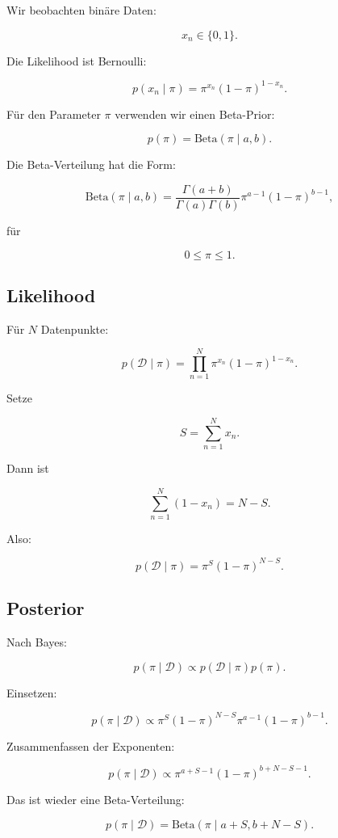 Wir beobachten binäre Daten:

\[
    x_n \in \{0,1\}.
\]

Die Likelihood ist Bernoulli:

\[
    p(x_n \mid \pi)
    =
    \pi^{x_n}
    (1-\pi)^{1-x_n}.
\]

Für den Parameter \(\pi\) verwenden wir einen Beta-Prior:

\[
    p(\pi)
    =
    \mathrm{Beta}(\pi \mid a,b).
\]

Die Beta-Verteilung hat die Form:

\[
    \mathrm{Beta}(\pi \mid a,b)
    =
    \frac{\Gamma(a+b)}{\Gamma(a)\Gamma(b)}
    \pi^{a-1}
    (1-\pi)^{b-1},
\]

für

\[
    0 \leq \pi \leq 1.
\]

\subsection{Likelihood}

Für \(N\) Datenpunkte:

\[
    p(\mathcal{D} \mid \pi)
    =
    \prod_{n=1}^{N}
    \pi^{x_n}
    (1-\pi)^{1-x_n}.
\]

Setze

\[
    S
    =
    \sum_{n=1}^{N}
    x_n.
\]

Dann ist

\[
    \sum_{n=1}^{N}
    (1-x_n)
    =
    N-S.
\]

Also:

\[
    p(\mathcal{D} \mid \pi)
    =
    \pi^S
    (1-\pi)^{N-S}.
\]

\subsection{Posterior}

Nach Bayes:

\[
    p(\pi \mid \mathcal{D})
    \propto
    p(\mathcal{D} \mid \pi)p(\pi).
\]

Einsetzen:

\[
    p(\pi \mid \mathcal{D})
    \propto
    \pi^S
    (1-\pi)^{N-S}
    \pi^{a-1}
    (1-\pi)^{b-1}.
\]

Zusammenfassen der Exponenten:

\[
    p(\pi \mid \mathcal{D})
    \propto
    \pi^{a+S-1}
    (1-\pi)^{b+N-S-1}.
\]

Das ist wieder eine Beta-Verteilung:

\[
    p(\pi \mid \mathcal{D})
    =
    \mathrm{Beta}(\pi \mid a+S,b+N-S).
\]

